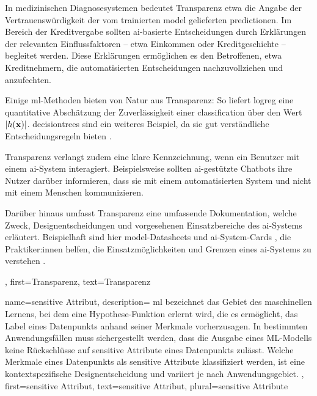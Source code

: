 {{{{{{		In medizinischen Diagnosesystemen bedeutet Transparenz etwa die Angabe der Vertrauenswürdigkeit 
		der vom trainierten \gls{model} gelieferten \gls{prediction}en. Im Bereich der Kreditvergabe 
		sollten \gls{ai}-basierte Entscheidungen durch Erklärungen der relevanten Einflussfaktoren 
		– etwa Einkommen oder Kreditgeschichte – begleitet werden. Diese Erklärungen ermöglichen es 
		den Betroffenen, etwa Kreditnehmern, die automatisierten Entscheidungen nachzuvollziehen und anzufechten. 
		
		Einige \gls{ml}-Methoden bieten von Natur aus Transparenz: So liefert \gls{logreg} 
		eine quantitative Abschätzung der Zuverlässigkeit einer \gls{classification} über den Wert $|h({\bf x})|$. 
		\Gls{decisiontree}s sind ein weiteres Beispiel, da sie gut verständliche Entscheidungsregeln 
		bieten \cite{rudin2019stop}.
		
		Transparenz verlangt zudem eine klare Kennzeichnung, wenn ein Benutzer mit einem \gls{ai}-System interagiert. 
		Beispielsweise sollten \gls{ai}-gestützte Chatbots ihre Nutzer darüber informieren, dass sie mit einem automatisierten 
		System und nicht mit einem Menschen kommunizieren. 
		
		Darüber hinaus umfasst Transparenz eine umfassende Dokumentation, welche Zweck, Designentscheidungen 
		und vorgesehenen Einsatzbereiche des \gls{ai}-Systems erläutert. Beispielhaft sind hier 
		\gls{model}-Datasheets \cite{DatasheetData2021} und \gls{ai}-System-Cards \cite{10.1145/3287560.3287596}, 
		die Praktiker:innen helfen, die Einsatzmöglichkeiten und Grenzen eines \gls{ai}-Systems zu verstehen \cite{Shahriari2017}.},
	first={Transparenz}, text={Transparenz} 
}

{
	name={sensitive Attribut},
	description={
		\gls{ml} bezeichnet das Gebiet des maschinellen Lernens, bei dem eine \gls{Hypothese}-Funktion erlernt wird, die es ermöglicht, das \gls{Label} eines \gls{Datenpunkts} anhand seiner \gls{Merkmale} vorherzusagen. In bestimmten Anwendungsfällen muss sichergestellt werden, dass die Ausgabe eines \gls{ML}-Modells keine Rückschlüsse auf sensitive Attribute eines \gls{Datenpunkts} zulässt. Welche Merkmale eines \gls{Datenpunkts} als sensitive Attribute klassifiziert werden, ist eine kontextspezifische Designentscheidung und variiert je nach Anwendungsgebiet.
	},
	first={sensitive Attribut},
	text={sensitive Attribut}, plural={sensitive Attribute}
}


}}}}
